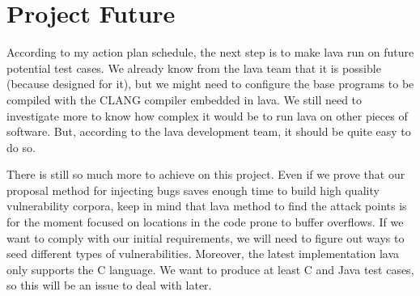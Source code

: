 \vspace{-0.5cm}

\section{Project Future}

According to my action plan schedule, the next step is to make \gls{lava} run on future potential test cases. We already know from the \gls{lava} team that it is possible (because designed for it), but we might need to configure the base programs to be compiled with the CLANG compiler embedded in \gls{lava}. We still need to investigate more to know how complex it would be to run \gls{lava} on other pieces of software. But, according to the \gls{lava} development team, it should be quite easy to do so.

There is still so much more to achieve on this project. Even if we prove that our proposal method for injecting bugs saves enough time to build high quality vulnerability corpora, keep in mind that \gls{lava} method to find the attack points is for the moment focused on locations in the code prone to buffer overflows. If we want to comply with our initial requirements, we will need to figure out ways to seed different types of vulnerabilities. Moreover, the latest implementation \gls{lava} only supports the C language. We want to produce at least C and Java test cases, so this will be an issue to deal with later.